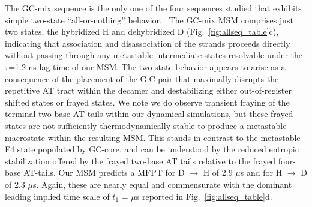 \documentclass[journal=jpcbfk,manuscript=article]{achemso}
\newcommand*{\rood}[1]{{\color{red}{#1}}}
\begin{document}
The GC-mix sequence is the only one of the four sequences studied that exhibits simple two-state ``all-or-nothing'' behavior.~\citep{Xiao2019, Araque2016LatticeCooperativity, Sikora2013ModelingIntermediates, Sanstead2016} The GC-mix MSM comprises just two states, the hybridized H and dehybridized D (Fig.~\ref{fig:allseq_table}c), indicating that association and disassociation of the strands proceeds directly without passing through any metastable intermediate states resolvable under the $\tau$=1.2 ns lag time of our MSM. The two-state behavior appears to arise as a consequence of the placement of the G:C pair that maximally disrupts the repetitive AT tract within the decamer and destabilizing either out-of-register shifted states or frayed states. We note we do observe transient fraying of the terminal two-base AT tails within our dynamical simulations, but these frayed states are not sufficiently thermodynamically stable to produce a metastable macrostate within the resulting MSM. This stands in contrast to the metastable F4 state populated by GC-core, and can be understood by the reduced entropic stabilization offered by the frayed two-base AT tails relative to the frayed four-base AT-tails. Our MSM predicts a MFPT for D $\rightarrow$ H of 2.9 $\mu$s and for H $\rightarrow$ D of 2.3 $\mu$s. Again, these are nearly equal and commensurate with the dominant leading implied time scale of $t_1$ = \rood{XX} $\mu$s reported in Fig.~\ref{fig:allseq_table}d.

\end{document}
